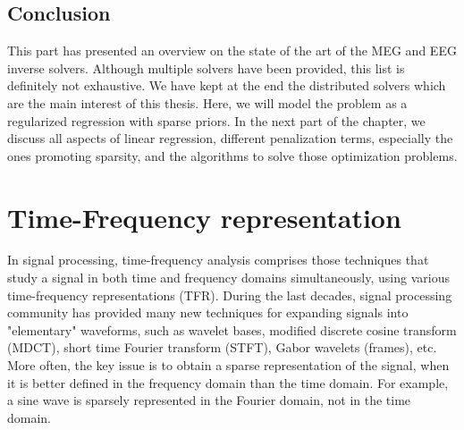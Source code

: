 




\subsection{Conclusion}
This part has presented an overview on the state of the art of the MEG and EEG inverse solvers. Although multiple solvers have been provided, this list is definitely not exhaustive.
We have kept at the end the distributed solvers which are the main interest of this thesis. Here, we will model the problem as a regularized regression with sparse priors. In the next part of the chapter, we discuss all aspects of linear regression, different penalization terms, especially the ones promoting sparsity, and the algorithms to solve those optimization problems.

\section{Time-Frequency representation}
\label{section:TF}
In signal processing, time-frequency analysis comprises those techniques that study a signal in both time and frequency domains simultaneously, using various time-frequency representations (TFR). During the last decades, signal processing community has provided many new techniques for expanding signals into "elementary" waveforms, such as wavelet bases, modified discrete cosine transform (MDCT), short time Fourier transform (STFT), Gabor wavelets (frames), etc. More often, the key issue is to obtain a sparse representation of the signal, when it is better defined in the frequency domain than the time domain. For example, a sine wave is sparsely represented in the Fourier domain, not in the time domain.\\


